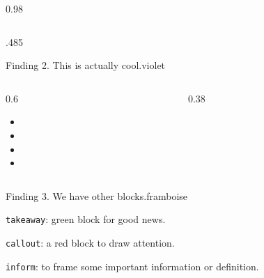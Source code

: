 \documentclass[final,svgnames,english]{beamer}
\begin{document}
\begin{frame}[fragile]{}
\begin{columns}[T]
\begin{column}{0.98\linewidth}
\begin{columns}[T]
\begin{column}{.485\linewidth}
\begin{plainblock}{}
        \begin{findingblock}{Finding 2. This is actually cool.}{violet}
            \begin{columns}[T]
                \begin{column}{0.6\textwidth}
                    \begin{itemize}
                        \item \lipsum[1][1] 
                        \item \lipsum[1][2]
                        \item \lipsum[1][3]
                        \item \lipsum[1][4] 
                    \end{itemize} 
                \end{column}
                \begin{column}{0.38\textwidth}
                
                \end{column}
            \end{columns}
        \end{findingblock}
    
        \begin{findingblock}{Finding 3. We have other blocks.}{framboise}
            \begin{takeaway}
                \texttt{takeaway}: green block for good news. \lipsum[1][1-2]
            \end{takeaway}
        
            \begin{callout}
                \texttt{callout}: a red block to draw attention. \lipsum[1][1-2]
            \end{callout}
        
            \begin{inform}
                \texttt{inform}: to frame some important information or definition. \lipsum[1][1-2]
            \end{inform}
        \end{findingblock}
    

\end{plainblock}
\end{column}
\end{columns}
\end{column}
\end{columns}
\end{frame}
\end{document}
